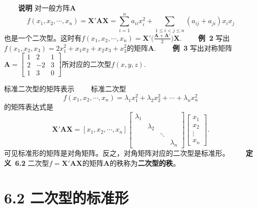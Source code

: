 \documentclass[compress,mathserif,cjk]{beamer}
\theoremstyle{remark}
\numberwithin{equation}{section}
\newcommand{\hei}{\bf}      %
\begin{document}
\begin{CJK}{UTF8}{gbsn}
\begin{frame}
 \ \ \ \ {\hei 说明} 对一般方阵$\bm A$
 $$f(x_1,x_2,\cdots,x_n)=\bm X'\bm{AX}=\sum_{i=1}^na_{ii}x_i^2+\sum_{1\leq i<j\leq n}(a_{ij}+a_{ji})x_ix_j$$
 也是一个二次型。\pause 这时有$f(x_1,x_2,\cdots,x_n)=\bm X'\Big(\frac{\bm A+\bm A'}2\Big)\bm X$.
 \pause\vskip 15pt
\ \ \ \ {\hei 例~2} 写出$f(x_1,x_2,x_3)=2x_1^2+x_1x_2+x_2x_3+x_3^2$的矩阵$\bm A$.
\pause\vskip 10pt
\ \ \ \ {\hei 例~3} 写出对称矩阵$\bm A=\left[\begin{matrix}1&2&1\\2&-2&3\\1&3&0\end{matrix}\right]$所对应的二次型$f(x,y,z)$.
\end{frame}

\begin{frame}{标准二次型的矩阵表示}
\ \ \ \ 标准二次型
$$f(x_1,x_2,\cdots,x_n)=\lambda_1x_1^2+\lambda_2x_2^2+\cdots+\lambda_nx_n^2$$
的矩阵表达式是
$$\bm X'\bm{AX}=[x_1,x_2,\cdots,x_n]\left[\begin{matrix}\lambda_1&&&\\&\lambda_2&&\\&&\ddots&\\&&&\lambda_n\end{matrix}\right]\left[\begin{matrix}x_1\\x_2\\\vdots\\x_n\end{matrix}\right].$$
可见标准形的矩阵是对角矩阵。反之，对角矩阵对应的二次型是标准形。
\pause\vskip 10pt
\ \ \ \ {\hei 定义~6.2} 二次型$f=\bm X'\bm{AX}$的矩阵$\bm A$的秩称为{\hei 二次型的秩}。
\end{frame}

\section[6.2]{6.2 二次型的标准形}


\end{CJK}
\end{document}
